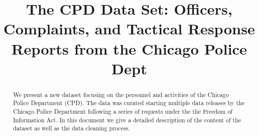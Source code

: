 \documentclass{article}
\title{The CPD Data Set: Officers, Complaints, and Tactical Response Reports from the Chicago Police Dept}
\begin{document}
\maketitle

\begin{abstract}
	We present a new dataset focusing on the personnel and activities of the
	Chicago Police Department (CPD). The data was curated starting multiple
	data releases by the Chicago Police Department following a series of
	requests under the the Freedom of Information Act. In this document we give
	a detailed description of the content of the dataset as well as the data
	cleaning process.
\end{abstract}








\end{document}
